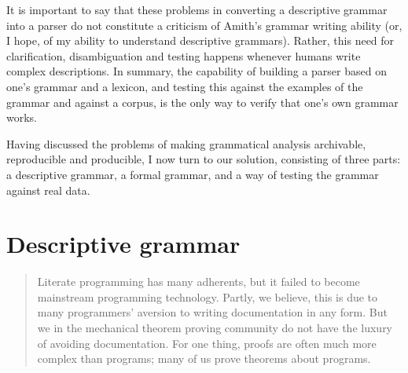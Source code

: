 It is important to say that these problems in converting a descriptive grammar into a parser do not constitute a criticism of Amith's grammar writing ability (or, I hope, of my ability to understand descriptive grammars). Rather, this need for clarification, disambiguation and testing happens whenever humans write complex descriptions. In summary, the capability of building a parser based on one's grammar and a lexicon, and testing this against the examples of the grammar and against a corpus, is the only way to verify that one's own grammar works.

Having discussed the problems of making grammatical analysis archivable, reproducible and  producible, I now turn to our solution, consisting of three parts: a descriptive grammar, a formal grammar, and a way of testing the grammar against real data.

\newpage
\section{Descriptive grammar}
\begin{quote} 
 Literate programming has many adherents, but it failed to become mainstream programming technology.  Partly, we believe, this is due to many programmers' aversion to writing documentation in any form.  But we in the mechanical theorem proving community do not have the luxury of avoiding documentation. For one thing, proofs are often much more complex than programs; many of us prove theorems about programs. \citep{Gamboa2003}
\end{quote}


